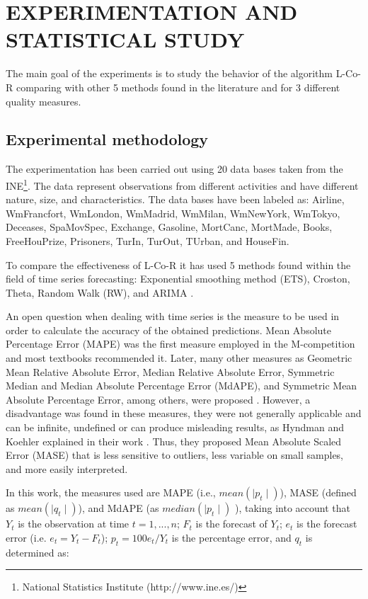 \documentclass[a4paper,twoside]{article}
\newcommand{\metodo}{L-Co-R}
\begin{document}
\section{\uppercase{Experimentation and statistical study}}
\label{sec:experimentation}

\noindent The main goal of the experiments is to study the behavior of the algorithm {\metodo} comparing with other 5 methods found in the literature and for 3 different quality measures. 

\subsection{Experimental methodology}
\label{experimentalmethodoly}

\noindent The experimentation has been carried out using 20 data bases taken from the INE\footnote{National Statistics Institute (http://www.ine.es/)}. The data represent observations from different activities and have different nature, size, and characteristics. The data bases have been labeled as: Airline, WmFrancfort, WmLondon, WmMadrid, WmMilan, WmNewYork, WmTokyo, Deceases, SpaMovSpec, Exchange, Gasoline, MortCanc, MortMade, Books, FreeHouPrize, Prisoners, TurIn, TurOut, TUrban, and HouseFin.

To compare the effectiveness of {\metodo} it has used 5 methods found
within the field of time series forecasting: Exponential smoothing
method (ETS), Croston, Theta, Random Walk (RW), and ARIMA \cite{HyndmanKhandakar:2008}.

An open question when dealing with time series is the measure to be used in order to calculate the accuracy of the obtained predictions. Mean Absolute Percentage Error (MAPE) \cite{Bowerman2004} was the first measure employed in the M-competition \cite{Makridakis1982} and most textbooks recommended it. Later, many other measures as Geometric Mean Relative Absolute Error, Median Relative Absolute Error, Symmetric Median and Median Absolute Percentage Error (MdAPE), and Symmetric Mean Absolute Percentage Error, among others, were proposed \cite{Makridakis2000}. However, a disadvantage was found in these measures, they were not generally applicable and can be infinite, undefined or can produce misleading results, as Hyndman and Koehler explained in their work \cite{Hyndman2006}. Thus, they proposed Mean Absolute Scaled Error (MASE) that is less sensitive to outliers, less variable on small samples, and more easily interpreted.

In this work, the measures used are MAPE (i.e., $mean(\mid p_t\mid)$), MASE (defined as $mean(\mid q_t\mid)$), and MdAPE (as $median(\mid p_t\mid)$ ), taking into account that $Y_t$ is the observation at time $t = {1,...,n}$; $F_t$ is the forecast of $Y_t$; $e_t$ is the forecast error (i.e. $e_t= Y_t - F_t$); $p_t = 100e_t/Y_t$ is the percentage error, and $q_t$ is determined as:
\end{document}
